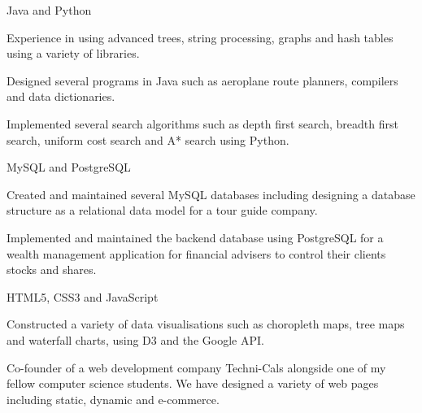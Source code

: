 \begin{cventries}
  \cventry
    {Java and Python}
    {}
    {}
    {}
    {
      \begin{cvitems}
        \item {Experience in using advanced trees, string processing, graphs and hash tables using a variety of libraries.}
        \item {Designed several programs in Java such as aeroplane route planners, compilers and data dictionaries.}
        \item {Implemented several search algorithms such as depth first search, breadth first search, uniform cost search and A* search using Python.}
      \end{cvitems}
    }
  \cventry
    {MySQL and PostgreSQL}
    {}
    {}
    {}
    {
      \begin{cvitems}
        \item {Created and maintained several MySQL databases including designing a database structure as a relational data model for a tour guide company.}
        \item {Implemented and maintained the backend database using PostgreSQL for a wealth management application for financial advisers to control their clients stocks and shares.}
      \end{cvitems}
    }
  \cventry
    {HTML5, CSS3 and JavaScript}
    {}
    {}
    {}
    {
      \begin{cvitems}
        \item {Constructed a variety of data visualisations such as choropleth maps, tree maps and waterfall charts, using D3 and the Google API.}
        \item {Co-founder of a web development company Techni-Cals alongside one of my fellow computer science students. We have designed a variety of web pages including static, dynamic and e-commerce.}
      \end{cvitems}
    }
\end{cventries}

